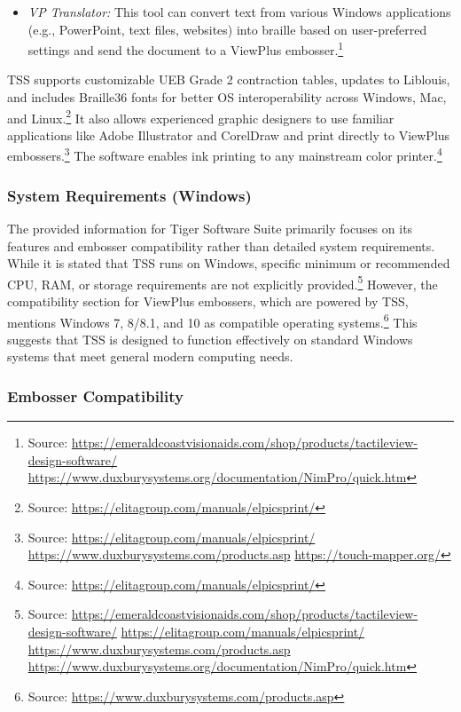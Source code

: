 \begin{itemize}
    \item \emph{VP Translator:} This tool can convert text from various Windows applications (e.g., PowerPoint, text files, websites) into braille based on user-preferred settings and send the document to a ViewPlus embosser.\footnote{Source:  \url{https://emeraldcoastvisionaids.com/shop/products/tactileview-design-software/} \url{https://www.duxburysystems.org/documentation/NimPro/quick.htm}}
\end{itemize}

TSS supports customizable UEB Grade 2 contraction tables, updates to Liblouis, and includes Braille36 fonts for better OS interoperability across Windows, Mac, and Linux.\footnote{Source:  \url{https://elitagroup.com/manuals/elpicsprint/}} It also allows experienced graphic designers to use familiar applications like Adobe Illustrator and CorelDraw and print directly to ViewPlus embossers.\footnote{Source:  \url{https://elitagroup.com/manuals/elpicsprint/} \url{https://www.duxburysystems.com/products.asp} \url{https://touch-mapper.org/}} The software enables ink printing to any mainstream color printer.\footnote{Source:  \url{https://elitagroup.com/manuals/elpicsprint/}}

\subsubsection{System Requirements (Windows)}

The provided information for Tiger Software Suite primarily focuses on its features and embosser compatibility rather than detailed system requirements. While it is stated that TSS runs on Windows, specific minimum or recommended CPU, RAM, or storage requirements are not explicitly provided.\footnote{Source:  \url{https://emeraldcoastvisionaids.com/shop/products/tactileview-design-software/} \url{https://elitagroup.com/manuals/elpicsprint/} \url{https://www.duxburysystems.com/products.asp} \url{https://www.duxburysystems.org/documentation/NimPro/quick.htm}} However, the compatibility section for ViewPlus embossers, which are powered by TSS, mentions Windows 7, 8/8.1, and 10 as compatible operating systems.\footnote{Source:  \url{https://www.duxburysystems.com/products.asp}} This suggests that TSS is designed to function effectively on standard Windows systems that meet general modern computing needs.

\subsubsection{Embosser Compatibility}

